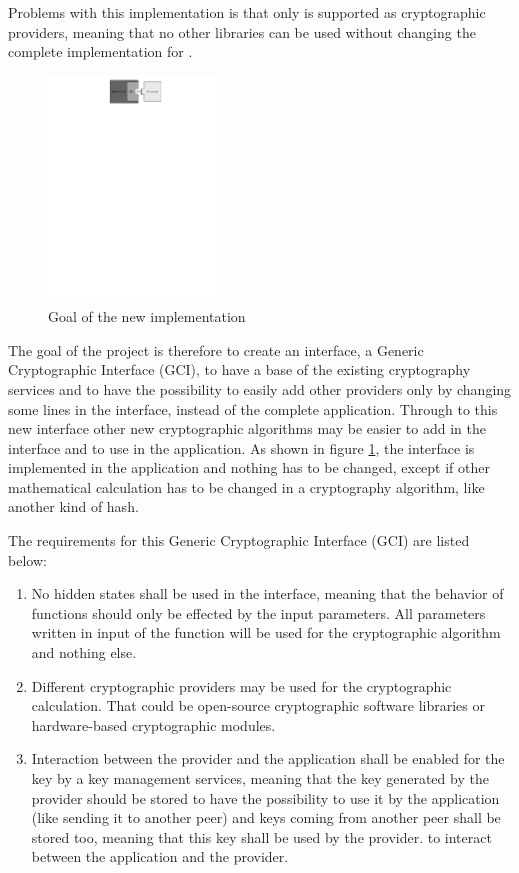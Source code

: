 Problems with this implementation is that only \tomcrypt is
supported as cryptographic providers, meaning that no other libraries can be used
without changing the complete implementation for \embtls. \newline
\newpage
\begin{figure}[!ht]
\centering
\includegraphics[trim=6cm 24.5cm 2cm 0cm, height=6cm]{figures/intro_gci.pdf}
\caption{Goal of the new implementation}
\label{fig:motiv_gci}
\end{figure}
The goal of the project is therefore to create an interface, a Generic
Cryptographic Interface (GCI), to have a base of the existing cryptography
services and to have the possibility to easily add other providers only by
changing some lines in the interface, instead of the complete
application.\newline
Through to this new interface other new cryptographic algorithms may be
easier to add in the interface and to use in the application.\newline
As shown in figure \ref{fig:motiv_gci}, the interface is implemented in the
application and nothing has to be changed, except if other mathematical
calculation has to be changed in a cryptography algorithm, like another
kind of hash.\newline

The requirements for this Generic Cryptographic Interface (GCI) are listed
below:
\begin{enumerate}
  \item No hidden states shall be used in the interface, meaning that the
  behavior of functions should only be effected by the input parameters.\newline
  All parameters written in input of the function will be used for the
  cryptographic algorithm and nothing else.
  \item Different cryptographic providers may be used for the cryptographic
  calculation. \newline
  That could be open-source cryptographic software libraries or hardware-based cryptographic modules.
  \item Interaction between the provider and the application shall be
  enabled for the key by a  key management services, meaning that the key
  generated by the provider should be stored to have the possibility to use it
  by the application (like sending it to another peer) and keys coming from
  another peer shall be stored too, meaning that this key shall be used by the provider.
  \newline to interact between the application and
  the provider.
\end{enumerate}
 